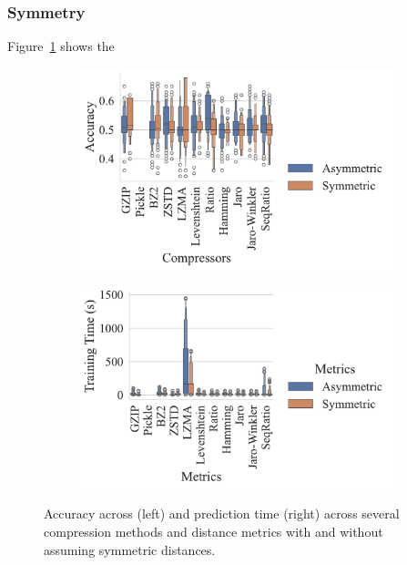 \subsubsection{Symmetry}

Figure~\ref{fig:truthseeker_symmetry} shows the 

\begin{figure}[h!]
    \centering
    \captionsetup[subfigure]{skip=0pt}
    \begin{subfigure}[t]{.44\textwidth}
        \centering
        \includegraphics[width=\textwidth]{figs/truthseeker/symmetric_vs_metric.pdf}
    \end{subfigure}
    \begin{subfigure}[t]{.44\textwidth}
        \centering
        \includegraphics[width=\textwidth]{figs/truthseeker/symmetric_vs_metric_train_time.pdf}
    \end{subfigure}
    \caption{Accuracy across (left) and prediction time (right) across several compression methods and distance metrics with and without assuming symmetric distances.}
    \label{fig:truthseeker_symmetry}
\end{figure}